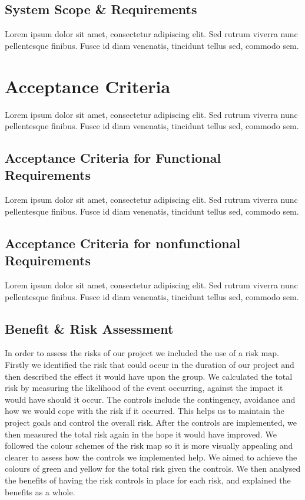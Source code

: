 \subsection*{System Scope \& Requirements}
Lorem ipsum dolor sit amet, consectetur adipiscing elit. Sed rutrum viverra nunc pellentesque finibus. Fusce id diam venenatis, tincidunt tellus sed, commodo sem.

\section{Acceptance Criteria}
Lorem ipsum dolor sit amet, consectetur adipiscing elit. Sed rutrum viverra nunc pellentesque finibus. Fusce id diam venenatis, tincidunt tellus sed, commodo sem.

\subsection*{Acceptance Criteria for Functional Requirements}
Lorem ipsum dolor sit amet, consectetur adipiscing elit. Sed rutrum viverra nunc pellentesque finibus. Fusce id diam venenatis, tincidunt tellus sed, commodo sem.

\subsection*{Acceptance Criteria for nonfunctional Requirements}
Lorem ipsum dolor sit amet, consectetur adipiscing elit. Sed rutrum viverra nunc pellentesque finibus. Fusce id diam venenatis, tincidunt tellus sed, commodo sem.

\subsection*{Benefit \& Risk Assessment}

In order to assess the risks of our project we included the use of a risk map. Firstly we identified the risk that could occur in the duration of our project and then described the effect it would have upon the group. We calculated the total risk by measuring the likelihood of the event occurring, against the impact it would have should it occur. The controls include the contingency, avoidance and how we would cope with the risk if it occurred. This helps us to maintain the project goals and control the overall risk. After the controls are implemented, we then measured the total risk again in the hope it would have improved. We followed the colour schemes of the risk map so it is more visually appealing and clearer to assess how the controls we implemented help. We aimed to achieve the colours of green and yellow for the total risk given the controls. We then analysed the benefits of having the risk controls in place for each risk, and explained the benefits as a whole.

